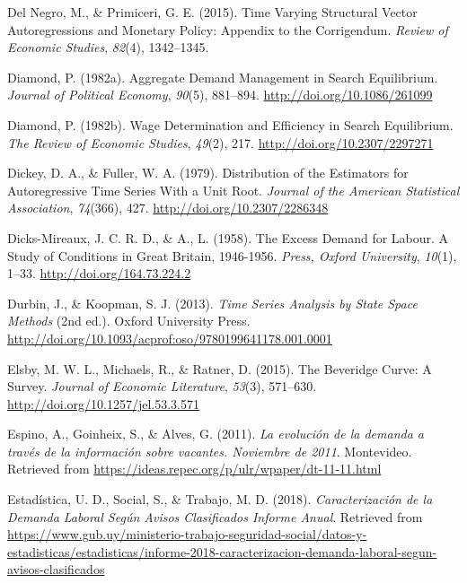 \documentclass[12pt,oneside]{reedthesis}
\begin{document}
\leavevmode\hypertarget{ref-DelNegro2015}{}%
Del Negro, M., \& Primiceri, G. E. (2015). Time Varying Structural Vector Autoregressions and Monetary Policy: Appendix to the Corrigendum. \emph{Review of Economic Studies}, \emph{82}(4), 1342--1345.

\leavevmode\hypertarget{ref-Diamond1982}{}%
Diamond, P. (1982a). Aggregate Demand Management in Search Equilibrium. \emph{Journal of Political Economy}, \emph{90}(5), 881--894. \url{http://doi.org/10.1086/261099}

\leavevmode\hypertarget{ref-Diamond1982B}{}%
Diamond, P. (1982b). Wage Determination and Efficiency in Search Equilibrium. \emph{The Review of Economic Studies}, \emph{49}(2), 217. \url{http://doi.org/10.2307/2297271}

\leavevmode\hypertarget{ref-DickeyFuller1979}{}%
Dickey, D. A., \& Fuller, W. A. (1979). Distribution of the Estimators for Autoregressive Time Series With a Unit Root. \emph{Journal of the American Statistical Association}, \emph{74}(366), 427. \url{http://doi.org/10.2307/2286348}

\leavevmode\hypertarget{ref-Dicks-Mireaux1958}{}%
Dicks-Mireaux, J. C. R. D., \& A., L. (1958). The Excess Demand for Labour. A Study of Conditions in Great Britain, 1946-1956. \emph{Press, Oxford University}, \emph{10}(1), 1--33. \url{http://doi.org/164.73.224.2}

\leavevmode\hypertarget{ref-Durbin2013}{}%
Durbin, J., \& Koopman, S. J. (2013). \emph{Time Series Analysis by State Space Methods} (2nd ed.). Oxford University Press. \url{http://doi.org/10.1093/acprof:oso/9780199641178.001.0001}

\leavevmode\hypertarget{ref-Elsby2015}{}%
Elsby, M. W. L., Michaels, R., \& Ratner, D. (2015). The Beveridge Curve: A Survey. \emph{Journal of Economic Literature}, \emph{53}(3), 571--630. \url{http://doi.org/10.1257/jel.53.3.571}

\leavevmode\hypertarget{ref-Alma2011}{}%
Espino, A., Goinheix, S., \& Alves, G. (2011). \emph{La evolución de la demanda a través de la información sobre vacantes. Noviembre de 2011}. Montevideo. Retrieved from \url{https://ideas.repec.org/p/ulr/wpaper/dt-11-11.html}

\leavevmode\hypertarget{ref-MTSS2018}{}%
Estadística, U. D., Social, S., \& Trabajo, M. D. (2018). \emph{Caracterización de la Demanda Laboral Según Avisos Clasificados Informe Anual}. Retrieved from \url{https://www.gub.uy/ministerio-trabajo-seguridad-social/datos-y-estadisticas/estadisticas/informe-2018-caracterizacion-demanda-laboral-segun-avisos-clasificados}
\end{document}
